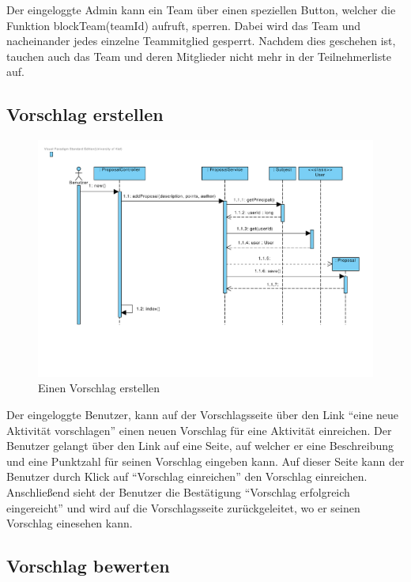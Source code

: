 Der eingeloggte Admin kann ein Team über einen speziellen Button, welcher die Funktion blockTeam(teamId) aufruft, sperren. Dabei wird das Team und nacheinander jedes einzelne Teammitglied gesperrt. Nachdem dies geschehen ist, tauchen auch das Team und deren Mitglieder nicht mehr in der Teilnehmerliste auf.\\

\subsection{Vorschlag erstellen}

\begin{figure}[H]
  \centering
  \includegraphics[width=\textwidth, clip]{gfx/vorschlag_erstellen}
  \caption{Einen Vorschlag erstellen}
\end{figure}

Der eingeloggte Benutzer, kann auf der Vorschlagsseite über den Link
``eine neue Aktivität vorschlagen'' einen neuen Vorschlag für eine
Aktivität einreichen. Der Benutzer gelangt über den Link auf eine
Seite, auf welcher er eine Beschreibung und eine Punktzahl für seinen Vorschlag
 eingeben kann. Auf dieser Seite kann der Benutzer durch Klick auf
 ``Vorschlag einreichen'' den Vorschlag einreichen. Anschließend sieht
 der Benutzer die Bestätigung ``Vorschlag erfolgreich eingereicht''
 und wird auf die Vorschlagsseite zurückgeleitet, wo er seinen
 Vorschlag einesehen kann.
 
\subsection{Vorschlag bewerten}


